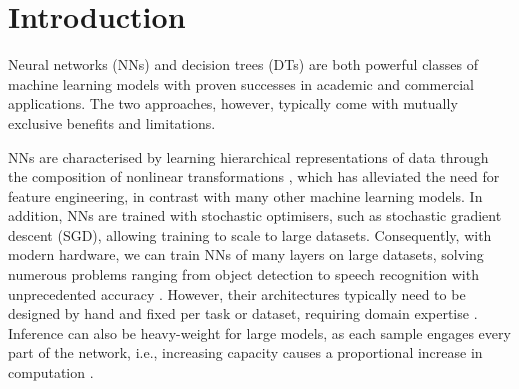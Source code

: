 \section{Introduction}
Neural networks (NNs) and decision trees (DTs) are both powerful classes of machine learning models with proven successes in academic and commercial applications. The two approaches, however, typically come with mutually exclusive benefits and limitations.

NNs are characterised by learning hierarchical representations of data through the composition of nonlinear transformations \cite{zeiler2014visualizing,bengio2013deep}, %
which has alleviated the need for feature engineering, in contrast with many other machine learning models. In addition, NNs are trained with stochastic optimisers, such as stochastic gradient descent (SGD), allowing training to scale to large datasets. Consequently, with modern hardware, we can train NNs of many layers on large datasets, solving numerous problems ranging from object detection to speech recognition with unprecedented accuracy \cite{lecun2015deep}. However, their architectures typically need to be designed by hand and fixed per task or dataset, requiring domain expertise \cite{zoph2016neural}. Inference can also be heavy-weight for large models, as each sample engages every part of the network, i.e., increasing capacity causes a proportional increase in computation \cite{bengio2013estimating}. 


